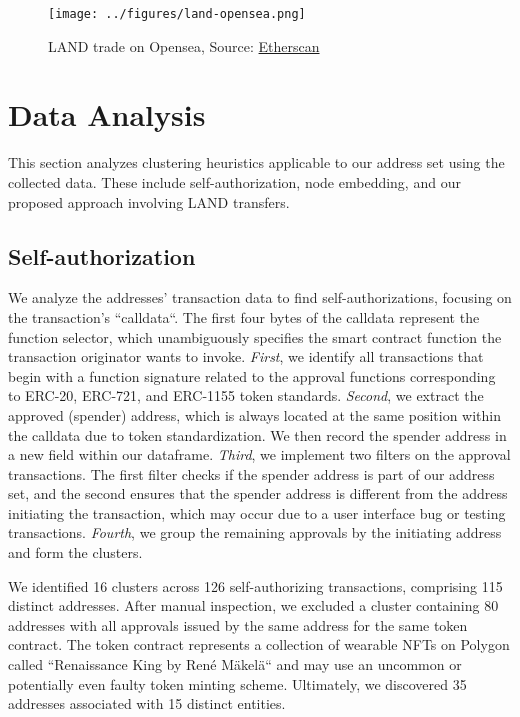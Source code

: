 \documentclass[12pt,a4paper,titlepage,oneside,english]{article}
\begin{document}
\begin{figure}[h!]
	\centering
	\texttt{[image: ../figures/land-opensea.png]}
	\caption{LAND trade on Opensea, Source: \href{https://etherscan.io/tx/0x2c2a70114e9080596bf5da6ad9c9b9f6d7e4c85a9d3b06e992f7248f9457a2ec}{Etherscan}}
	\label{fig:LAND_example}
\end{figure}

\vspace{2em}


\section{Data Analysis}
This section analyzes clustering heuristics applicable to our address set using the collected data. These include self-authorization, node embedding, and our proposed approach involving LAND transfers. %

\subsection{Self-authorization}

We analyze the addresses' transaction data to find self-authorizations, focusing on the transaction's ``calldata``. The first four bytes of the calldata represent the function selector, which unambiguously specifies the smart contract function the transaction originator wants to invoke. \newline
\textit{First}, we identify all transactions that begin with a function signature related to the approval functions corresponding to ERC-20, ERC-721, and ERC-1155 token standards. \textit{Second}, we extract the approved (spender) address, which is always located at the same position within the calldata due to token standardization. We then record the spender address in a new field within our dataframe. \textit{Third}, we implement two filters on the approval transactions. The first filter checks if the spender address is part of our address set, and the second ensures that the spender address is different from the address initiating the transaction, which may occur due to a user interface bug or testing transactions. \textit{Fourth}, we group the remaining approvals by the initiating address and form the clusters.

We identified 16 clusters across 126 self-authorizing transactions, comprising 115 distinct addresses. After manual inspection, we excluded a cluster containing 80 addresses with all approvals issued by the same address for the same token contract. The token contract represents a collection of wearable NFTs on Polygon called ``Renaissance King by René Mäkelä`` and may use an uncommon or potentially even faulty token minting scheme. Ultimately, we discovered 35 addresses associated with 15 distinct entities.
\end{document}
